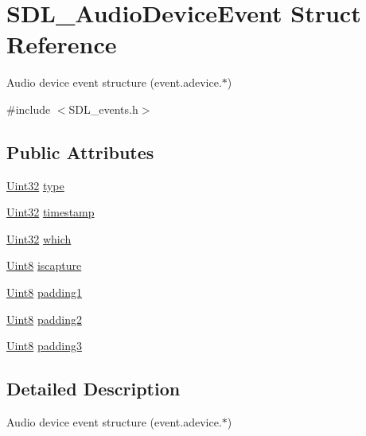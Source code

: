 \hypertarget{struct_s_d_l___audio_device_event}{}\section{S\+D\+L\+\_\+\+Audio\+Device\+Event Struct Reference}
\label{struct_s_d_l___audio_device_event}


Audio device event structure (event.\+adevice.$\ast$)  




{\ttfamily \#include $<$S\+D\+L\+\_\+events.\+h$>$}

\subsection*{Public Attributes}
\begin{DoxyCompactItemize}
\item 
\mbox{\hyperlink{_s_d_l__stdinc_8h_add440eff171ea5f55cb00c4a9ab8672d}{Uint32}} \mbox{\hyperlink{struct_s_d_l___audio_device_event_ae68c3bd49b49608711a17395c7cbfe58}{type}}
\item 
\mbox{\hyperlink{_s_d_l__stdinc_8h_add440eff171ea5f55cb00c4a9ab8672d}{Uint32}} \mbox{\hyperlink{struct_s_d_l___audio_device_event_aa471680486a6103eafc9af569016df57}{timestamp}}
\item 
\mbox{\hyperlink{_s_d_l__stdinc_8h_add440eff171ea5f55cb00c4a9ab8672d}{Uint32}} \mbox{\hyperlink{struct_s_d_l___audio_device_event_ac91d70fd4e1dd596185fed061388896c}{which}}
\item 
\mbox{\hyperlink{_s_d_l__stdinc_8h_a2944638813a090aa23e62f4da842c3e2}{Uint8}} \mbox{\hyperlink{struct_s_d_l___audio_device_event_a1482dcd50b47046ef8e9bfa7cc7457d9}{iscapture}}
\item 
\mbox{\hyperlink{_s_d_l__stdinc_8h_a2944638813a090aa23e62f4da842c3e2}{Uint8}} \mbox{\hyperlink{struct_s_d_l___audio_device_event_ad6efdec7189e735f4a05fc123c0cb723}{padding1}}
\item 
\mbox{\hyperlink{_s_d_l__stdinc_8h_a2944638813a090aa23e62f4da842c3e2}{Uint8}} \mbox{\hyperlink{struct_s_d_l___audio_device_event_adf9bebd56d707860045d31359535a2a4}{padding2}}
\item 
\mbox{\hyperlink{_s_d_l__stdinc_8h_a2944638813a090aa23e62f4da842c3e2}{Uint8}} \mbox{\hyperlink{struct_s_d_l___audio_device_event_af3163ba92c77f08a4f0d8f043f24c96c}{padding3}}
\end{DoxyCompactItemize}


\subsection{Detailed Description}
Audio device event structure (event.\+adevice.$\ast$) 


